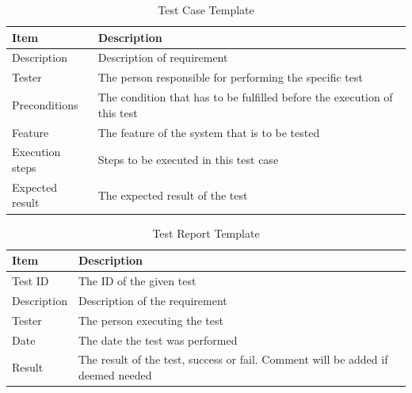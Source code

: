 \begin{table}
\caption{Test Case Template}
\centering
\begin{tabular}{ l l }
\hline
 Item            & Description                                                              \\ 
\hline
 Description     & Description of requirement                                               \\ 
 Tester          & The person responsible for performing the specific test                  \\ 
 Preconditions   & The condition that has to be fulfilled before the execution of this test \\ 
 Feature         & The feature of the system that is to be tested                           \\ 
 Execution steps & Steps to be executed in this test case                                   \\ 
 Expected result & The expected result of the test                                          \\
\hline
\end{tabular}
\label{table:testcase}
\end{table}

\begin{table}
\caption{Test Report Template}
\centering
\begin{tabular}{ l l }
\hline
Item        & Description                             \\ 
\hline
Test ID     & The ID of the given test                \\ 
Description & Description of the requirement          \\ 
Tester      & The person executing the test           \\ 
Date        & The date the test was performed         \\ 
Result      & The result of the test, success or fail. Comment will be added if deemed needed \\
\hline
\end{tabular}
\label{table:testreport}
\end{table}

